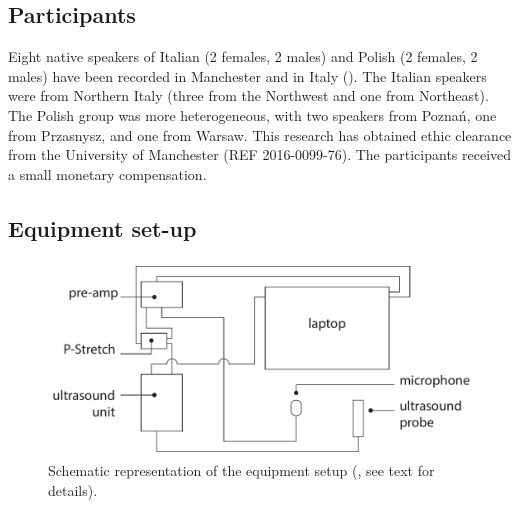 \documentclass[authoryear, twocolumn]{elsarticle}
\begin{document}
\subsection{Participants}\label{participants}


Eight native speakers of Italian (2 females, 2 males) and Polish (2
females, 2 males) have been recorded in Manchester and in Italy
(). The Italian speakers were from Northern Italy
(three from the Northwest and one from Northeast). The Polish group was
more heterogeneous, with two speakers from Poznań, one from Przasnysz,
and one from Warsaw. This research has obtained ethic clearance from the
University of Manchester (REF 2016-0099-76). The participants received a
small monetary compensation.

\subsection{Equipment set-up}\label{equipment-set-up}

\begin{figure}
    \centering
    \includegraphics[width=.7\textwidth]{../../graphics/uti-setup.pdf}
    \caption{Schematic representation of the equipment setup (\citealt{articulate2011}, see text for details).}
    \label{f:uti-setup}
\end{figure}
\end{document}
